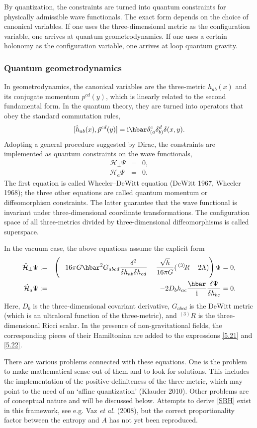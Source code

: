 \documentclass[12pt]{article}
\newcommand{\be}{\begin{equation}}
\newcommand{\ee}{\end{equation}}
\newcommand{\bea}{\begin{eqnarray}}
\newcommand{\eea}{\end{eqnarray}}
\newcommand{\lb}{\label}
\newcommand{\I}{{\rm i}}
\begin{document}
By quantization, the constraints are turned into quantum constraints
for physically admissible wave functionals. The exact form depends on
the choice of canonical variables. If one uses the three-dimensional
metric as the configuration variable, one arrives at quantum
geometrodynamics. If one uses a certain holonomy as the configuration
variable, one arrives at loop quantum gravity. 

\subsubsection{Quantum geometrodynamics} 

In geometrodynamics, the canonical variables are the three-metric
${h}_{ab}(x)$ and its conjugate momentum ${p}^{cd}(y)$, which is
linearly related to the second fundamental form. In the quantum
theory, they are turned into operators that obey the standard
commutation rules,
\be
\lb{5.3}
[\hat{h}_{ab}(x),\hat{p}^{cd}(y)]=
\I\hbar\delta^c_{(a}\delta^d_{b)}\delta(x,y).
\ee
Adopting a general procedure suggested by Dirac, the constraints are
implemented as quantum constraints on the wave functionals,
\bea
{\mathcal H}_{\perp} \Psi &=& 0, \lb{5.6} \\ 
{\mathcal H}_a \Psi &=& 0. \lb{5.7}
\eea
The first equation is called Wheeler--DeWitt equation
(DeWitt 1967, Wheeler 1968); the three other
equations are called quantum momentum or diffeomorphism
constraints. The latter guarantee that the wave functional
is invariant under three-di\-men\-sio\-nal coordinate
transformations. The configuration space of all three-metrics divided
by three-dimensional diffeomorphisms is called superspace.

In the vacuum case, the above equations assume the explicit form
\bea
\hat{\mathcal H}_{\perp}\Psi&:=&
\left(-16\pi G\hbar^2G_{abcd}\frac{\delta^2}{\delta h_{ab}\delta h_{cd}}
-\frac{\sqrt{h}}{16\pi G}(\,{}^{(3)}\!R-2\Lambda)\right)\Psi=0, \lb{5.21}\\
\hat{\mathcal H}_a\Psi &:=& -2D_bh_{ac}\frac{\hbar}{\I}
\frac{\delta\Psi}{\delta h_{bc}} =0. \lb{5.22}
\eea
Here, $D_b$ is the three-dimensional covariant derivative,
$G_{abcd}$ is the DeWitt metric (which is an ultralocal function of the
three-metric), and ${}^{(3)}\!R$ is the three-dimensional Ricci
scalar. In the presence of non-gravitational fields, the corresponding
pieces of their Hamiltonian are added to the expressions \eqref{5.21}
and \eqref{5.22}. 

There are various problems connected with these equations. One is the
problem to make mathematical sense out of them and to look for
solutions. This includes the implementation of the
positive-definiteness of the three-metric, which may point to the need
of an `affine quantization' (Klauder 2010).
Other problems are of conceptual nature and will be
discussed below. Attempts to derive \eqref{SBH} exist in this
framework, see e.g. Vaz {\em et al.} (2008), but the correct
proportionality factor between the entropy and $A$ has not yet been
reproduced. 
\end{document}

